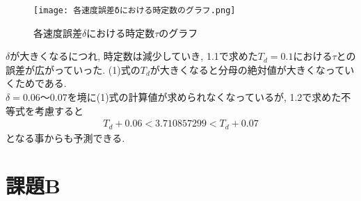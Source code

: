 \documentclass[a4paper,11pt]{jsarticle}
\begin{document}
\begin{figure}[H]
	\begin{center}
		\texttt{[image: 各速度誤差δにおける時定数のグラフ.png]}
		\caption{各速度誤差$\delta$における時定数$\tau$のグラフ}
		\label{各速度誤差δにおける時定数のグラフ}
	\end{center}
\end{figure}
$\delta$が大きくなるにつれ, 時定数は減少していき, 1.1で求めた$T_d=0.1$における$\tau$との誤差が広がっていった.
(1)式の$T_d$が大きくなると分母の絶対値が大きくなっていくためである.\\
$\delta=0.06〜0.07$を境に(1)式の計算値が求められなくなっているが, 1.2で求めた不等式を考慮すると
\begin{align}
	T_d+0.06<3.710857299<T_d+0.07
\end{align}
となる事からも予測できる.

\section{課題B}
\end{document}
